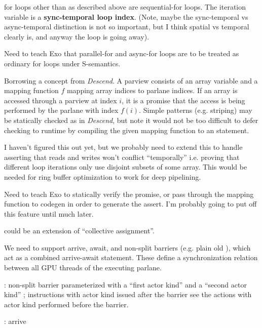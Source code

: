 \filbreak
{} for loops other than as described above are sequential-for loops.
The iteration variable is a \textbf{sync-temporal loop index}.
(Note, maybe the sync-temporal vs async-temporal distinction is not so important, but I think spatial vs temporal clearly is, and anyway the  loop is going away).

 Need to teach Exo that parallel-for and async-for loops are to be treated as ordinary for loops under S-semantics.

\filbreak
{} Borrowing a concept from \textit{Descend}.
A parview consists of an array variable and a mapping function $f$ mapping array indices to parlane indices.
If an array is accessed through a parview at index $i$, it is a promise that the access is being performed by the parlane with index $f(i)$.
Simple patterns (e.g. striping) may be statically checked as in \textit{Descend}, but note it would not be too difficult to defer checking to runtime by compiling the given mapping function to an  statement.

I haven't figured this out yet, but we probably need to extend this to handle asserting that reads and writes won't conflict ``temporally'' i.e. proving that different loop iterations only use disjoint subsets of some array.
This would be needed for ring buffer optimization to work for deep pipelining.

 Need to teach Exo to statically verify the promise, or pass through the mapping function to codegen in order to generate the assert.
I'm probably going to put off this feature until much later.

 could be an extension of ``collective assignment''.

\filbreak
{} We need to support arrive, await, and non-split barriers (e.g. plain old ), which act as a combined arrive-await statement.
These define a synchronization relation between all GPU threads of the executing parlane.

: non-split barrier parameterized with a ``first actor kind''  and a ``second actor kind'' ; instructions with actor kind  issued after the barrier see the actions with actor kind  performed before the barrier.

: arrive


